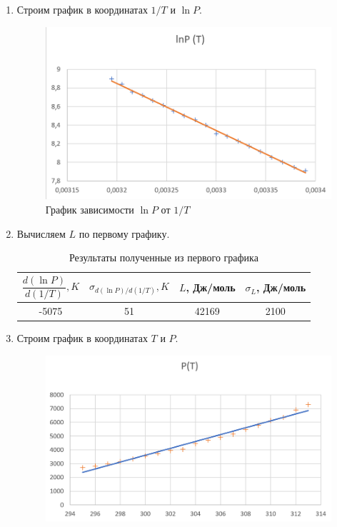 \documentclass[a4paper, 12pt]{article}%
\begin{document}
\begin{enumerate}
\newpage
\item Строим график в координатах $1/T$ и $\ln P$.
\begin{figure}[h]
\includegraphics[width = \textwidth]{lnp.png}
\caption{График зависимости $\ln P$ от $1/T$}
\end{figure} 
\item Вычисляем $L$ по первому графику.
\begin{table}[h]
\begin{tabular}{|c|c|c|c|}
\hline
$\dfrac{d(\ln P)}{d(1/T)}, K$ & $\sigma_{d(\ln P)/d(1/T)}, K$ & $L$, Дж/моль & $\sigma_L$, Дж/моль \\ \hline
-5075 & 51 & 42169 & 2100 \\ \hline
\end{tabular}
\caption{Результаты полученные из первого графика}
\end{table} 
\newpage
\item Строим график в координатах $T$ и $P$.
\begin{figure}[h]
\includegraphics[width = \textwidth]{dh(t).png}

\end{figure}
\end{enumerate}
\end{document}
